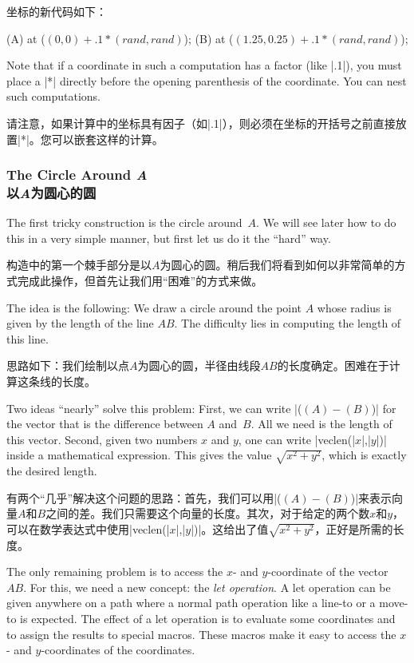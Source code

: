坐标的新代码如下：
%
\begin{codeexample}
\coordinate [...] (A) at ($ (0,0) + .1*(rand,rand) $);
\coordinate [...] (B) at ($ (1.25,0.25) + .1*(rand,rand) $);
\end{codeexample}

Note that if a coordinate in such a computation has a factor (like |.1|), you
must place a |*| directly before the opening parenthesis of the coordinate. You
can nest such computations.

请注意，如果计算中的坐标具有因子（如|.1|），则必须在坐标的开括号之前直接放置|*|。您可以嵌套这样的计算。



\subsubsection{The Circle Around \emph{A}\\以\emph{A}为圆心的圆}

The first tricky construction is the circle around~$A$. We will see later how
to do this in a very simple manner, but first let us do it the ``hard'' way.

构造中的第一个棘手部分是以$A$为圆心的圆。稍后我们将看到如何以非常简单的方式完成此操作，但首先让我们用“困难”的方式来做。

The idea is the following: We draw a circle around the point $A$ whose radius
is given by the length of the line $AB$. The difficulty lies in computing the
length of this line.

思路如下：我们绘制以点$A$为圆心的圆，半径由线段$AB$的长度确定。困难在于计算这条线的长度。

Two ideas ``nearly'' solve this problem: First, we can write |($ (A) - (B) $)|
for the vector that is the difference between $A$ and~$B$. All we need is the
length of this vector. Second, given two numbers $x$ and $y$, one can write
|veclen(|$x$|,|$y$|)| inside a mathematical expression. This gives the value
$\sqrt{x^2+y^2}$, which is exactly the desired length.

有两个“几乎”解决这个问题的思路：首先，我们可以用|($ (A) - (B) $)|来表示向量$A$和$B$之间的差。我们只需要这个向量的长度。其次，对于给定的两个数$x$和$y$，可以在数学表达式中使用|veclen(|$x$|,|$y$|)|。这给出了值$\sqrt{x^2+y^2}$，正好是所需的长度。

The only remaining problem is to access the $x$- and $y$-coordinate of the
vector~$AB$. For this, we need a new concept: the \emph{let operation}. A let
operation can be given anywhere on a path where a normal path operation like a
line-to or a move-to is expected. The effect of a let operation is to evaluate
some coordinates and to assign the results to special macros. These macros make
it easy to access the $x$- and $y$-coordinates of the coordinates.

